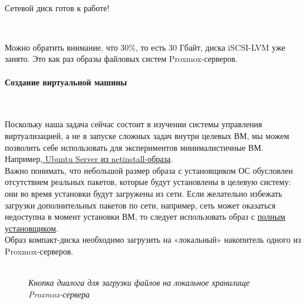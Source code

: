 \documentclass[14pt, a4paper]{article}
\begin{document}
\begin{figure}[h]
    \centering
    \\
    \label{framework} 
\end{figure}

Сетевой диск готов к работе!

\begin{figure}[h]
    \centering
    \\
    \label{framework} 
\end{figure}

Можно обратить внимание, что 30\%, то есть 30 Гбайт, диска iSCSI-LVM уже занято. Это как раз
образы файловых систем Proxmox-серверов.

\newpage

\paragraph*{Создание виртуальной машины} \mbox{}\\

Поскольку наша задача сейчас состоит в изучении системы управления виртуализацией, а не в
запуске сложных задач внутри целевых ВМ, мы можем позволить себе использовать для
экспериментов минималистичные ВМ. Например,\href{https://help.ubuntu.com/community/Installation/MinimalCD}{ Ubuntu Server из netinstall-образа}.\\

Важно понимать, что небольшой размер образа с установщиком ОС обусловлен отсутствием
реальных пакетов, которые будут установлены в целевую систему: они во время установки будут
загружены из сети. Если желательно избежать загрузки дополнительных пакетов по сети, например,
сеть может оказаться недоступна в момент установки ВМ, то следует использовать образ с 
\href{https://ubuntu.com/download/server}{полным установщиком}.\\

Образ компакт-диска необходимо загрузить на «локальный» накопитель одного из Proxmox-серверов.

\begin{figure}[h]
    \centering
    \\
    \small\textit{Кнопка диалога для загрузки файлов на локальное хранилище Proxmox-сервера}  
    \label{framework} 
\end{figure}
\end{document}
